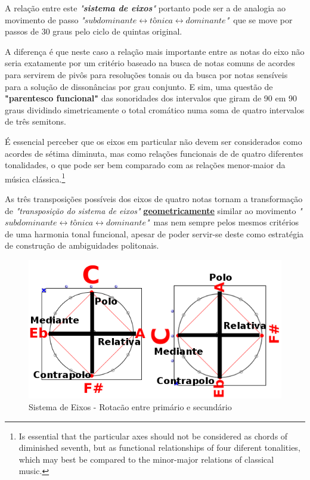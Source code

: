 \documentclass[
	12pt,				%
	openright,			%
	twoside,			%
	a4paper,			%
	english,			%
	french,				%
	spanish,			%
	brazil				%
	]{abntex2}
\begin{document}
A relação entre este \textit{"\textbf{sistema de eixos}"} portanto pode ser a de analogia ao movimento de passo \textit{"$subdominante \leftrightarrow tônica \leftrightarrow dominante$"}\ que se move por passos de 30 graus pelo ciclo de quintas original.  

A diferença é que neste caso a relação mais importante entre as notas do eixo não seria exatamente por um critério baseado na busca de notas comuns de acordes para servirem de pivôs para resoluções tonais ou da busca por notas sensíveis para a solução de dissonâncias por grau conjunto. E sim, uma questão de \textbf{"\textbf{parentesco funcional}"} das sonoridades dos intervalos que giram de 90 em 90 graus dividindo simetricamente o total cromático numa soma de quatro intervalos de três semitons.

\begin{citacao}
É essencial perceber que os eixos em particular não devem ser considerados como acordes de sétima diminuta, mas como relações funcionais de de quatro diferentes tonalidades, o que pode ser bem comparado com as relações menor-maior da música clássica.\cite[p. 3]{lendvai1971bela}\footnote{
Is essential that the particular axes should not be considered as chords of diminished seventh, but as functional relationships of four diferent tonalities, which may best be compared to the minor-major relations of classical music.\cite[p. 3]{lendvai1971bela}}
\end{citacao}

As três transposições possíveis dos eixos de quatro notas tornam a transformação de \textit{"transposição do sistema de eixos"} \textbf{\textbf{\underline{geometricamente}}} similar ao movimento \textit{"$subdominante \leftrightarrow tônica \leftrightarrow dominante$"}\ mas nem sempre pelos mesmos critérios de uma harmonia tonal funcional, apesar de poder servir-se deste como estratégia de construção de ambiguidades politonais.

\begin{figure}[!h]
	\caption{\label{fig_grafico}Sistema de Eixos - Rotacão entre primário e secundário}
	\begin{center}
	    \includegraphics[scale=0.4]{axis/PoloContrapolo.png}
	\end{center}
\end{figure}
\end{document}
